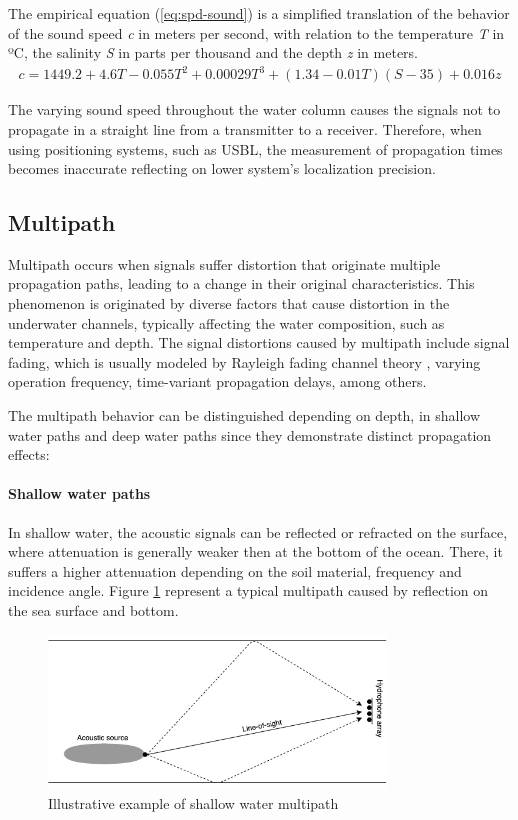 The empirical equation (\ref{eq:spd-sound}) \cite{ocean-acoust} is a simplified translation of the behavior of the sound speed \textit{c} in meters per second, with relation to the temperature \textit{T} in ºC, the salinity \textit{S} in parts per thousand and the depth \textit{z} in meters. 
\begin{eqnarray}
c = 1449.2 + 4.6T - 0.055T^2 + 0.00029T^3 + (1.34 - 0.01T)(S-35) + 0.016z 
\label{eq:spd-sound}
\end{eqnarray}

The varying sound speed throughout the water column causes the signals not to propagate in a straight line from a transmitter to a receiver. Therefore, when using positioning systems, such as USBL, the measurement of propagation times becomes inaccurate reflecting on lower system's localization precision.

\subsection{Multipath} \label{subsec:multipath}

Multipath occurs when signals suffer distortion that originate multiple propagation paths, leading to a change in their original characteristics. This phenomenon is originated by diverse factors that cause distortion in the underwater channels, typically affecting the water composition, such as temperature and depth. The signal distortions caused by multipath include signal fading, which is usually modeled by Rayleigh fading channel theory \cite{multipath-rayleigh-models}, varying operation frequency, time-variant propagation delays, among others.

The multipath behavior can be distinguished depending on depth, in shallow water paths and deep water paths since they demonstrate distinct propagation effects: 

\paragraph{Shallow water paths} In shallow water, the acoustic signals can be reflected or refracted on the surface, where attenuation is generally weaker then at the bottom of the ocean. There, it suffers a higher attenuation depending on the soil material, frequency and incidence angle. Figure \ref{fig:mpath} represent a typical multipath caused by reflection on the sea surface and bottom. 

\begin{figure}[!htbp]
	\centering
	\includegraphics[width=0.8\textwidth]{figures/multipath}
	\caption{Illustrative example of shallow water multipath}
	\label{fig:mpath}
\end{figure}


